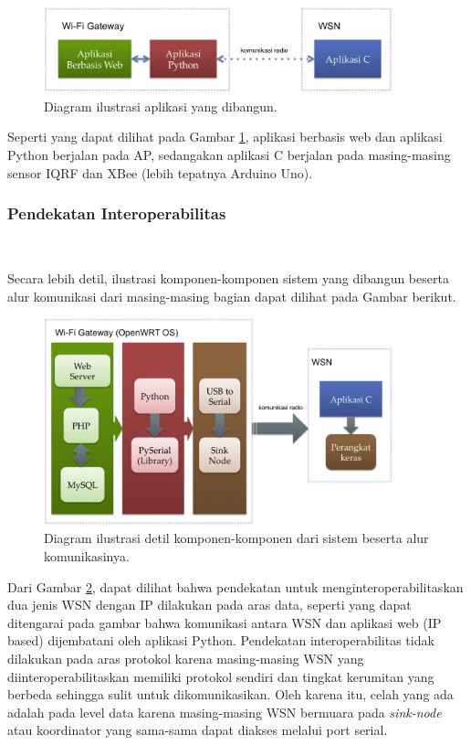 			\begin{figure}[H]
			  \centering
			    \includegraphics[width=0.9\textwidth]{gambar/aplikasi}
			    \caption{Diagram ilustrasi aplikasi yang dibangun.}
			    \label{aplikasi}
			\end{figure}

		Seperti yang dapat dilihat pada Gambar \ref{aplikasi}, aplikasi berbasis web dan aplikasi Python berjalan pada AP, sedangakan aplikasi C berjalan pada masing-masing sensor IQRF dan XBee (lebih tepatnya Arduino Uno).

		\subsubsection{Pendekatan Interoperabilitas} \
		
		Secara lebih detil, ilustrasi komponen-komponen sistem yang dibangun beserta alur komunikasi dari masing-masing bagian dapat dilihat pada Gambar berikut.

			\begin{figure}[H]
			  \centering
			    \includegraphics[width=0.9\textwidth]{gambar/communication}
			    \caption{Diagram ilustrasi detil komponen-komponen dari sistem beserta alur komunikasinya.}
			    \label{communication}
			\end{figure}

		Dari Gambar \ref{communication}, dapat dilihat bahwa pendekatan untuk menginteroperabilitaskan dua jenis WSN dengan IP dilakukan pada aras data, seperti yang dapat ditengarai pada gambar bahwa komunikasi antara WSN dan aplikasi web (IP based) dijembatani oleh aplikasi Python. Pendekatan interoperabilitas tidak dilakukan pada aras protokol karena masing-masing WSN yang diinteroperabilitaskan memiliki protokol sendiri dan tingkat kerumitan yang berbeda sehingga sulit untuk dikomunikasikan. Oleh karena itu, celah yang ada adalah pada level data karena masing-masing WSN bermuara pada \emph{sink-node} atau koordinator yang sama-sama dapat diakses melalui port serial.

